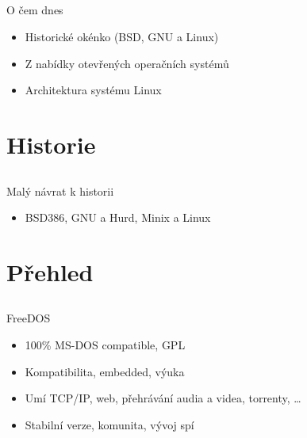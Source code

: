 \documentclass{beamer}
\begin{document}
\subsection{}
\begin{frame}{O čem dnes}
\begin{itemize}
\item Historické okénko (BSD, GNU a Linux)
\item Z nabídky otevřených operačních systémů
\item Architektura systému Linux
\end{itemize}
\end{frame}


\section{Historie}

\subsection{}
\begin{frame}{Malý návrat k historii}
\begin{itemize}
\item BSD386, GNU a Hurd, Minix a Linux
\end{itemize}
\end{frame}


\section{Přehled}

\subsection{}
\begin{frame}{FreeDOS}
\begin{itemize}
\item 100\% MS-DOS compatible, GPL
\item Kompatibilita, embedded, výuka
\item Umí TCP/IP, web, přehrávání audia a videa, torrenty, \dots
\item Stabilní verze, komunita, vývoj spí
\end{itemize}
\end{frame}
\end{document}
